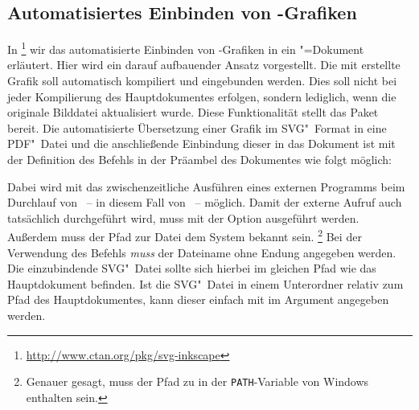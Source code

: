 \documentclass[%
  english,ngerman,%
  headings=optiontoheadandtoc,captions=tableheading,numbers=noenddot,%
  chapterpage,cdfoot,%
]{tudscrman}
\begin{document}
\subsection{Automatisiertes Einbinden von -Grafiken }
\label{sec:tat:svg}
In \footnote{\url{http://www.ctan.org/pkg/svg-inkscape}}
wir das automatisierte Einbinden von -Grafiken in ein 
"=Dokument erläutert. Hier wird ein darauf aufbauender Ansatz 
vorgestellt. Die mit  erstellte Grafik soll automatisch 
kompiliert und eingebunden werden. Dies soll nicht bei jeder Kompilierung des 
Hauptdokumentes erfolgen, sondern lediglich, wenn die originale Bilddatei 
aktualisiert wurde. Diese Funktionalität stellt das Paket  
bereit. Die automatisierte Übersetzung einer Grafik im SVG"~Format in eine   
PDF"~Datei und die anschließende Einbindung dieser in das Dokument ist mit der 
Definition des Befehls  
in der Präambel des Dokumentes wie folgt möglich:
%
Dabei wird mit  
das zwischenzeitliche Ausführen eines externen Programms beim Durchlauf von 
~-- in diesem Fall von ~-- möglich. Damit 
der externe Aufruf auch tatsächlich durchgeführt wird, muss  
mit der Option  ausgeführt werden. Außerdem muss der Pfad 
zur Datei  dem System bekannt sein.%
\footnote{%
  Genauer gesagt, muss der Pfad zu  in der 
  \texttt{PATH}-Variable von Windows enthalten sein.
}
Bei der Verwendung des Befehls  \emph{muss} der Dateiname 
ohne Endung angegeben werden. Die einzubindende SVG"~Datei sollte sich hierbei 
im gleichen Pfad wie das Hauptdokument befinden. Ist die SVG"~Datei in einem 
Unterordner relativ zum Pfad des Hauptdokumentes, kann dieser einfach mit 
 im Argument 
angegeben werden.
\end{document}
